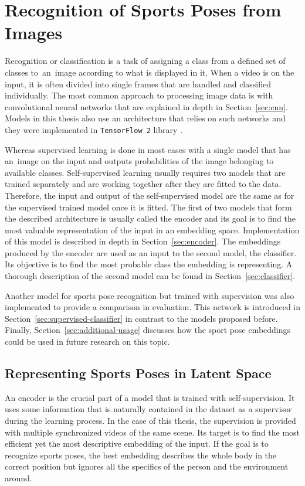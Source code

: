 \chapter{\label{chap:classification}Recognition of Sports Poses from Images}

Recognition or classification is a task of assigning a class from a defined set of classes to~an~image according to what is displayed in it. When a video is on the input, it is often divided into single frames that are handled and classified individually. The most common approach to processing image data is with convolutional neural networks that are explained in depth in Section~\ref{sec:cnn}. Models in this thesis also use an architecture that relies on such networks and they were implemented in \texttt{TensorFlow 2} library \cite{TensorFlow}.

Whereas supervised learning is done in most cases with a single model that has an~image on the input and outputs probabilities of the image belonging to available classes. Self-supervised learning usually requires two models that are trained separately and are working together after they are fitted to the data. Therefore, the input and output of the self-supervised model are the same as for the supervised trained model once it is fitted. The first of two models that form the described architecture is usually called the encoder and its goal is to find the most valuable representation of the input in an embedding space. Implementation of this model is described in depth in Section~\ref{sec:encoder}. The embeddings produced by the encoder are used as an input to the second model, the classifier. Its objective is to find the most probable class the embedding is representing. A thorough description of the second model can be found in Section~\ref{sec:classifier}.

Another model for sports pose recognition but trained with supervision was also implemented to provide a comparison in evaluation. This network is introduced in Section~\ref{sec:supervised-classifier} in contrast to the models proposed before. Finally, Section~\ref{sec:additional-usage} discusses how the sport pose embeddings could be used in future research on this topic.

\section{\label{sec:encoder}Representing Sports Poses in Latent Space}

An encoder is the crucial part of a model that is trained with self-supervision. It uses some information that is naturally contained in the dataset as a supervisor during the learning process. In the case of this thesis, the supervision is provided with multiple synchronized videos of the same scene. Its target is to find the most efficient yet the most descriptive embedding of the input. If the goal is to recognize sports poses, the best embedding describes the whole body in the correct position but ignores all the specifics of the person and the environment around.

